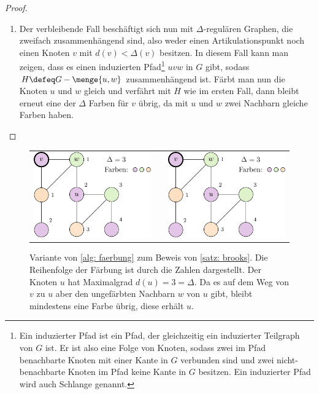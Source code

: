 \documentclass[ngerman, a4paper, 12pt]{article}
\theoremstyle{plain}
\theoremstyle{break}
\theoremstyle{proofstyle}
\newtheorem{proof}{Beweis}
\begin{document}
\begin{proof}
\begin{enumerate}[label=Fall \arabic* ---, leftmargin=*, itemindent=*]
			\item Der verbleibende Fall beschäftigt sich nun mit $\Delta$-regulären Graphen, die zweifach zusammenhängend sind, also weder einen Artikulationspunkt noch einen Knoten $v$ mit $d(v) < \Delta(v)$ besitzen. In diesem Fall kann man zeigen, dass es einen induzierten Pfad\footnote{Ein induzierter Pfad ist ein Pfad, der gleichzeitig ein induzierter Teilgraph von $G$ ist. Er ist also eine Folge von Knoten, sodass zwei im Pfad benachbarte Knoten mit einer Kante in $G$ verbunden sind und zwei nicht-benachbarte Knoten im Pfad keine Kante in $G$ besitzen. Ein induzierter Pfad wird auch Schlange genannt.} $uvw$ in $G$ gibt, sodass $H \defeq G - \menge{u, w}$ zusammenhängend ist. Färbt man nun die Knoten $u$ und $w$ gleich und verfährt mit $H$ wie im ersten Fall, dann bleibt erneut eine der $\Delta$ Farben für $v$ übrig, da mit $u$ und $w$ zwei Nachbarn gleiche Farben haben.
		\end{enumerate}
	\end{proof}

	\begin{figure}[hb]
		\centering
		\begin{tabular}{ccc}
			\includegraphics[page=2]{brooks.pdf}
			& \hspace{3em} &
			\includegraphics[page=1]{brooks.pdf}
		\end{tabular}
		\caption{Variante von \cref{alg: faerbung} zum Beweis von \cref{satz: brooks}. Die Reihenfolge der Färbung ist durch die Zahlen dargestellt. Der Knoten $u$ hat Maximalgrad $d(u) = 3 = \Delta$. Da es auf dem Weg von $v$ zu $u$ aber den ungefärbten Nachbarn $w$ von $u$ gibt, bleibt mindestens eine Farbe übrig, diese erhält $u$.}
	\end{figure}
\end{document}
